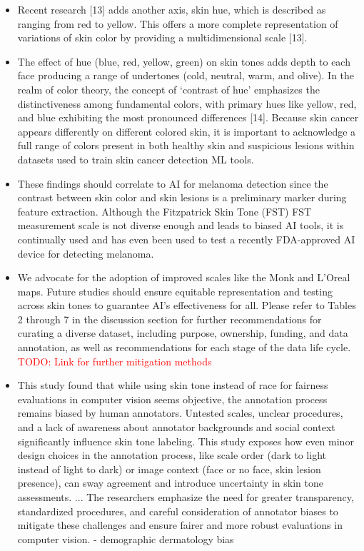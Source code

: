 \documentclass[12pt, a4paper, oneside]{book}   	%
\renewcommand{\todo}[1]{\textcolor{red}{TODO: #1}}
\newif\ifrawcitationactive
\newcommand{\rawcitationend}{
	\color{black}\rawcitationactivefalse
}
\begin{document}
\begin{itemize}
			\item Recent research [13] adds another axis, skin hue, which is described as ranging from red to yellow. This offers a more complete representation of variations of skin color by providing a multidimensional scale [13]. \autocite{Montoya_2025}
			\item The effect of hue (blue, red, yellow, green) on skin tones adds depth to each face producing a range of undertones (cold, neutral, warm, and olive). In the realm of color theory, the concept of ‘contrast of hue’ emphasizes the distinctiveness among fundamental colors, with primary hues like yellow, red, and blue exhibiting the most pronounced differences [14]. Because skin cancer appears differently on different colored skin, it is important to acknowledge a full range of colors present in both healthy skin and suspicious lesions within datasets used to train skin cancer detection \gls{ML} tools. \autocite{Montoya_2025}
			\item These findings should correlate to \gls{AI} for melanoma detection since the contrast between skin color and skin lesions is a preliminary marker during feature extraction. Although the Fitzpatrick Skin Tone (FST) \gls{FST} measurement scale is not diverse enough and leads to biased \gls{AI} tools, it is continually used and has even been used to test a recently FDA-approved \gls{AI} device for detecting melanoma. \autocite{Montoya_2025}
			\item We advocate for the adoption of improved scales like the Monk and L’Oreal maps. Future studies should ensure equitable representation and testing across skin tones to guarantee \gls{AI}’s effectiveness for all. Please refer to Tables 2 through 7 in the discussion section for further recommendations for curating a diverse dataset, including purpose, ownership, funding, and data annotation, as well as recommendations for each stage of the data life cycle. \autocite{Montoya_2025} \todo{Link for further mitigation methods}
			\item This study found that while using skin tone instead of race for fairness evaluations in computer vision seems objective, the annotation process remains biased by human annotators. Untested scales, unclear procedures, and a lack of awareness about annotator backgrounds and social context significantly influence skin tone labeling. This study exposes how even minor design choices in the annotation process, like scale order (dark to light instead of light to dark) or image context (face or no face, skin lesion presence), can sway agreement and introduce uncertainty in skin tone assessments. ... The researchers emphasize the need for greater transparency, standardized procedures, and careful consideration of annotator biases to mitigate these challenges and ensure fairer and more robust evaluations in computer vision. \autocite{Montoya_2025} - demographic dermatology bias
		\end{itemize}
	\rawcitationend
	
\end{document}
